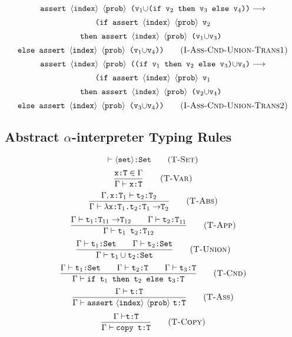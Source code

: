 \documentclass[a4paper]{article}
\begin{document}
$$
	\texttt{assert $\langle\text{\tt index}\rangle\ \langle\text{\tt prob}\rangle$ (v$_1$$\cup$(if v$_2$ then v$_3$ else v$_4$))}\longrightarrow
$$
$$
	\texttt{(if assert $\langle\text{\tt index}\rangle\ \langle\text{\tt prob}\rangle$ v$_2$}
$$
$$
	\texttt{then assert $\langle\text{\tt index}\rangle\ \langle\text{\tt prob}\rangle$ (v$_1$$\cup$v$_3$) }
$$
\begin{equation}
	\texttt{else assert $\langle\text{\tt index}\rangle\ \langle\text{\tt prob}\rangle$ (v$_1$$\cup$v$_4$))}
	\tag{\sc I-Ass-Cnd-Union-Trans1}
\end{equation}
$$
	\texttt{assert $\langle\text{\tt index}\rangle\ \langle\text{\tt prob}\rangle$ ((if v$_1$ then v$_2$ else v$_3$)$\cup$v$_4$)}\longrightarrow
$$
$$
	\texttt{(if assert $\langle\text{\tt index}\rangle\ \langle\text{\tt prob}\rangle$ v$_1$}
$$
$$
	\texttt{then assert $\langle\text{\tt index}\rangle\ \langle\text{\tt prob}\rangle$ (v$_2$$\cup$v$_4$) }
$$
\begin{equation}
	\texttt{else assert $\langle\text{\tt index}\rangle\ \langle\text{\tt prob}\rangle$ (v$_3$$\cup$v$_4$))}
	\tag{\sc I-Ass-Cnd-Union-Trans2}
\end{equation}
\subsection{Abstract $\alpha$-interpreter Typing Rules}
\begin{equation}
	\vdash\langle\text{\tt set}\rangle\text{\tt :Set}
	\tag{\sc T-Set}
\end{equation}
\begin{equation}
	\frac{\text{\tt x:T}\in\Gamma}
	{\Gamma\vdash\text{\tt x:T}}
	\tag{\sc T-Var}
\end{equation}
\begin{equation}
	\frac{\Gamma,\text{\tt x:T}_1\vdash\text{\tt t$_2$:T$_2$}}
	{\Gamma\vdash\lambda\text{\tt x:T$_1$.t$_2$:T$_1\rightarrow$T}_2}
	\tag{\sc T-Abs}
\end{equation}
\begin{equation}
	\frac{\Gamma\vdash\text{\tt t$_1$:T$_{11}\rightarrow$T$_{12}$}\qquad\Gamma\vdash\text{\tt t$_2$:T}_{11}}
	{\Gamma\vdash\text{\tt t$_1$ t$_2$:T}_{12}}
	\tag{\sc T-App}
\end{equation}
\begin{equation}
	\frac{\Gamma\vdash\text{\tt t$_1$:Set}\qquad\Gamma\vdash\text{\tt t$_2$:Set}}
	{\Gamma\vdash\text{\tt t}_1\cup \text{\tt t$_2$:Set}}
	\tag{\sc T-Union}
\end{equation}
\begin{equation}
	\frac{\Gamma\vdash\text{\tt t$_1$:Set}\qquad
	\Gamma\vdash\text{\tt t$_2$:T}\qquad\Gamma\vdash\text{\tt t$_3$:T}}
	{\Gamma\vdash\text{\tt if t$_1$ then t$_2$ else t$_3$:T}}
	\tag{\sc T-Cnd}
\end{equation}
\begin{equation}
	\frac{\Gamma\vdash\text{\tt t:T}}
	{\Gamma\vdash\text{\tt assert}\ \langle\text{\tt index}\rangle\ \langle\text{\tt prob}\rangle\ \text{\tt t:T}}
	\tag{\sc T-Ass}
\end{equation}
\begin{equation}
	\frac{\text{\tt $\Gamma\vdash$t:T}}
	{\Gamma\vdash\text{\tt copy t:T}}
	\tag{\sc T-Copy}
\end{equation}
\end{document}
